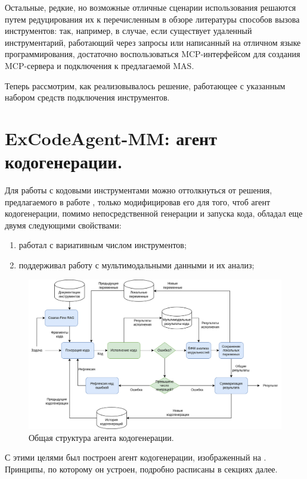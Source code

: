 Остальные, редкие, но возможные отличные сценарии использования 
решаются путем редуцирования их к перечисленным в обзоре литературы
способов вызова инструментов: так, например, в случае, если существует 
удаленный инструментарий, работающий через запросы или написанный на отличном языке 
программирования, достаточно воспользоваться MCP-интерфейсом 
для создания MCP-сервера и подключения к предлагаемой MAS.

Теперь рассмотрим, как реализовывалось решение, работающее с указанным набором 
средств подключения инструментов. 

\section{ExCodeAgent-MM: агент кодогенерации.} \label{ch3:sec1}

Для работы с кодовыми инструментами можно оттолкнуться от решения,
предлагаемого в работе \cite{codeact}, только модифицировав его для того, чтоб агент 
кодогенерации, помимо непосредственной генерации и запуска кода, обладал 
еще двумя следующими свойствами:
\begin{enumerate}
    \item работал с вариативным числом инструментов;
    \item поддерживал работу с мультимодальными данными и их анализ;
\end{enumerate} 

\begin{figure}
    \center
	\includegraphics[scale=0.15]{sources/диаграмма агента кодогенерации.drawio.png}
	\caption{Общая структура агента кодогенерации.} 
	\label{fig:ch3:excodeagent-mm}  
\end{figure}

С этими целями был построен агент кодогенерации, изображенный на . 
Принципы, по которому он устроен, подробно расписаны в секциях далее.

